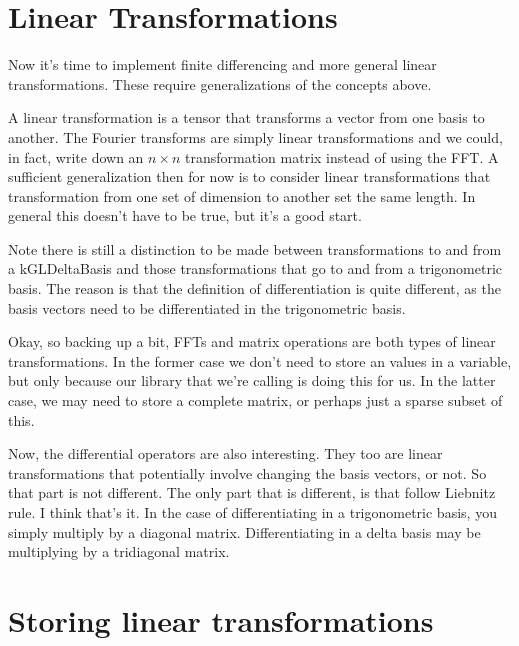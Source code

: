 \documentclass[11pt]{article}
\begin{document}
%
%

\section{Linear Transformations}

Now it's time to implement finite differencing and more general linear transformations. These require generalizations of the concepts above.

A linear transformation is a tensor that transforms a vector from one basis to another. The Fourier transforms are simply linear transformations and we could, in fact, write down an $n \times n$ transformation matrix instead of using the FFT. A sufficient generalization then for now is to consider linear transformations that transformation from one set of dimension to another set the same length. In general this doesn't have to be true, but it's a good start.

Note there is still a distinction to be made between transformations to and from a kGLDeltaBasis and those transformations that go to and from a trigonometric basis. The reason is that the definition of differentiation is quite different, as the basis vectors need to be differentiated in the trigonometric basis.

Okay, so backing up a bit, FFTs and matrix operations are both types of linear transformations. In the former case we don't need to store an values in a variable, but only because our library that we're calling is doing this for us. In the latter case, we may need to store a complete matrix, or perhaps just a sparse subset of this.

Now, the differential operators are also interesting. They too are linear transformations that potentially involve changing the basis vectors, or not. So that part is not different. The only part that is different, is that follow Liebnitz rule. I think that's it. In the case of differentiating in a trigonometric basis, you simply multiply by a diagonal matrix. Differentiating in a delta basis may be multiplying by a tridiagonal matrix.

%
%

\section{Storing linear transformations}
\end{document}
